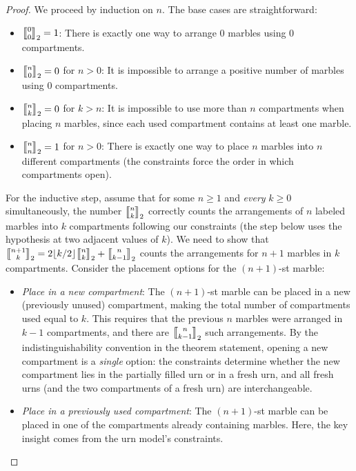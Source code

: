 \documentclass[a4paper]{amsart}
\numberwithin{equation}{section}
\newcommand{\mStirling}[0]{\genfrac{\llbracket}{\rrbracket}{0pt}{}}
\begin{document}
\begin{proof}
We proceed by induction on $n$. The base cases are straightforward:
\begin{itemize}
\item $\mStirling{0}{0}_2 = 1$: There is exactly one way to arrange 0 marbles using 0 compartments.
\item $\mStirling{n}{0}_2 = 0$ for $n > 0$: It is impossible to arrange a positive number of marbles using 0 compartments.
\item $\mStirling{n}{k}_2 = 0$ for $k > n$: It is impossible to use more than $n$ compartments when placing $n$ marbles, since each used compartment contains at least one marble.
\item $\mStirling{n}{n}_2 = 1$ for $n > 0$: There is exactly one way to place $n$ marbles into $n$ different compartments (the constraints force the order in which compartments open).
\end{itemize}
For the inductive step, assume that for some $n \geq 1$ and \emph{every} $k \geq 0$ simultaneously, the number $\mStirling{n}{k}_2$ correctly counts the arrangements of $n$ labeled marbles into $k$ compartments following our constraints (the step below uses the hypothesis at two adjacent values of $k$). We need to show that $\mStirling{n+1}{k}_2 = 2\lfloor k/2 \rfloor \mStirling{n}{k}_2 + \mStirling{n}{k-1}_2$ counts the arrangements for $n+1$ marbles in $k$ compartments.
Consider the placement options for the $(n+1)$-st marble:
\begin{itemize}
    \item \textit{Place in a new compartment}: The $(n+1)$-st marble can be placed in a new (previously unused) compartment, making the total number of compartments used equal to $k$. This requires that the previous $n$ marbles were arranged in $k-1$ compartments, and there are $\mStirling{n}{k-1}_2$ such arrangements. By the indistinguishability convention in the theorem statement, opening a new compartment is a \emph{single} option: the constraints determine whether the new compartment lies in the partially filled urn or in a fresh urn, and all fresh urns (and the two compartments of a fresh urn) are interchangeable.
    \item \textit{Place in a previously used compartment}: The $(n+1)$-st marble can be placed in one of the compartments already containing marbles. Here, the key insight comes from the urn model's constraints.
\end{itemize}


\end{proof}
\end{document}
